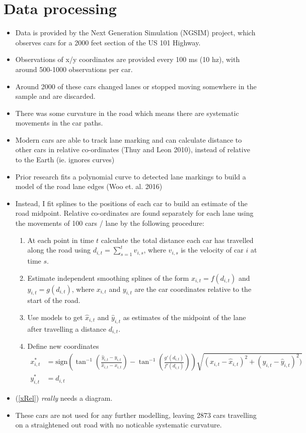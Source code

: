 \documentclass[12pt,a4paper]{article}\usepackage[]{graphicx}\usepackage[]{color}
\begin{document}
\section{Data processing}

\begin{itemize}
\item Data is provided by the Next Generation Simulation (NGSIM) project, which observes cars for a 2000 feet section of the US 101 Highway.
\item Observations of x/y coordinates are provided every 100 ms (10 hz), with around 500-1000 observations per car.
\item Around 2000 of these cars changed lanes or stopped moving somewhere in the sample and are discarded.
\item There was some curvature in the road which means there are systematic movements in the car paths.
\item Modern cars are able to track lane marking and can calculate distance to other cars in relative co-ordinates (Thuy and Leon 2010), instead of relative to the Earth (ie. ignores curves)
\item Prior research fits a polynomial curve to detected lane markings to build a model of the road lane edges (Woo et. al. 2016) 
\item Instead, I fit splines to the positions of each car to build an estimate of the road midpoint. Relative co-ordinates are found separately for each lane using the movements of 100 cars / lane by the following procedure:
\begin{enumerate}
\item At each point in time $t$ calculate the total distance each car has travelled along the road using $d_{i, t} = \sum_{s=1}^t v_{i, s}$, where $v_{i, s}$ is the velocity of car $i$ at time $s$. 
\item Estimate independent smoothing splines of the form $x_{i, t} = f(d_{i, t})$ and $y_{i, t} = g(d_{i, t})$, where $x_{i, t}$ and $y_{i, t}$ are the car coordinates relative to the start of the road.
\item Use models to get $\hat{x}_{i, t}$ and $\hat{y}_{i, t}$ as estimates of the midpoint of the lane after travelling a distance $d_{i, t}$.
\item Define new coordinates 
\begin{align}
x^*_{i, t} &= \mbox{sign}\left(\tan^{-1}\left(\frac{\hat{y}_{i, t} - y_{i, t}}{\hat{x}_{i, t} - x_{i, t}} \right) - \tan^{-1}\left(\frac{g'(d_{i, t}) }{f'(d_{i, t})}\right)\right)\sqrt{(x_{i, t}-\hat{x}_{i, t})^2 + (y_{i, t} - \hat{y}_{i, t})^2)} \label{xRel} \\
y^*_{i, t} &= d_{i, t} \label{yRel}
\end{align}
\end{enumerate}
\item (\ref{xRel}) \textit{really} needs a diagram.
\item These cars are not used for any further modelling, leaving 2873 cars travelling on a straightened out road with no noticable systematic curvature.
\end{itemize}
\end{document}
